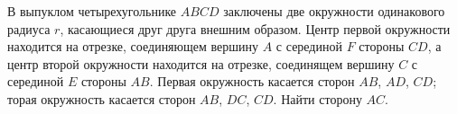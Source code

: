 \documentclass[preview]{standalone}
\begin{document}
В выпуклом четырехугольнике $ABCD$ заключены две окружности одинакового радиуса $r$, 
                          касающиеся друг друга внешним образом. Центр первой окружности находится на отрезке, 
                          соединяющем вершину $A$ с серединой $F$ стороны $CD$, а центр второй окружности находится 
                          на отрезке, соединящем вершину $C$ с серединой $E$ стороны $AB$. Первая окружность касается 
                          сторон $AB$, $AD$, $CD$; торая окружность касается сторон $AB$, $DC$, $CD$. Найти сторону $AC$.
\end{document}
